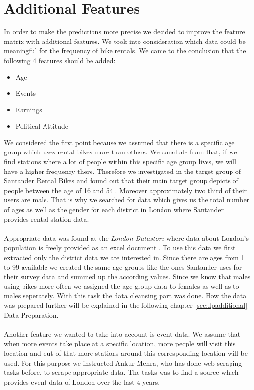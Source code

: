 
\section{Additional Features}
In order to make the predictions more precise we decided to improve the feature matrix with additional features.
We took into consideration which data could be meaningful for the frequency of bike rentals. 
We came to the conclusion that the following 4 features should be added:
\begin{itemize}
\item Age
\item Events
\item Earnings
\item Political Attitude
\end{itemize}
We considered the first point because we assumed that there is a specific age group which uses rental bikes more than others. We conclude from that, if we find stations where a lot of people within this specific age group lives, we will have a higher frequency there. Therefore we investigated in the target group of Santander Rental Bikes and found out that their main target group depicts of people between the age of 16 and 54 \cite{Santander}. Moreover approximately two third of their users are male. That is why we searched for data which gives us the total number of ages as well as the gender for each district in London where Santander provides rental station data. \\\\
Appropriate data was found at the \emph{London Datastore} where data about London's population is freely provided as an excel document \cite{LondonData}. To use this data we first extracted only the district data we are interested in. Since there are ages from 1 to 99 available we created the same age groups like the ones Santander uses for their survey data and summed up the according values. Since we know that males using bikes more often we assigned the age group data to females as well as to males seperately. With this task the data cleansing part was done. How the data was prepared further will be explained in the following chapter \ref{sec:dpadditional} Data Preparation.\\\\
Another feature we wanted to take into account is event data. We assume that when more events take place at a specific location, more people will visit this location and out of that more stations around this corresponding location will be used.
For this purpose we instructed Ankur Mehra, who has done web scraping tasks before, to scrape appropriate data. The tasks was to find a source which provides event data of London over the last 4 years.\\\\
